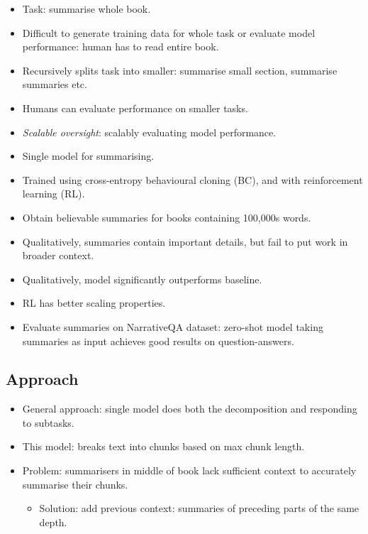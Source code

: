 \begin{itemize}
    \item Task: summarise whole book.
    \item Difficult to generate training data for whole task or evaluate model performance: human has to read entire book.
    \item Recursively splits task into smaller: summarise small section, summarise summaries etc.
    \item Humans can evaluate performance on smaller tasks.
    \item \emph{Scalable oversight}: scalably evaluating model performance.
    \item Single model for summarising.
    \item Trained using cross-entropy behavioural cloning (BC), and with reinforcement learning (RL).
    \item Obtain believable summaries for books containing 100,000s words.
    \item Qualitatively, summaries contain important details, but fail to put work in broader context.
    \item Qualitatively, model significantly outperforms baseline.
    \item RL has better scaling properties.
    \item Evaluate summaries on NarrativeQA dataset: zero-shot model taking summaries as input achieves good results on question-answers.
\end{itemize}


\subsection{Approach}

\begin{itemize}
    \item General approach: single model does both the decomposition and responding to subtasks.
    \item This model: breaks text into chunks based on max chunk length.
    \item Problem: summarisers in middle of book lack sufficient context to accurately summarise their chunks.
    \begin{itemize}
        \item Solution: add previous context: summaries of preceding parts of the same depth.
    \end{itemize}
\end{itemize}